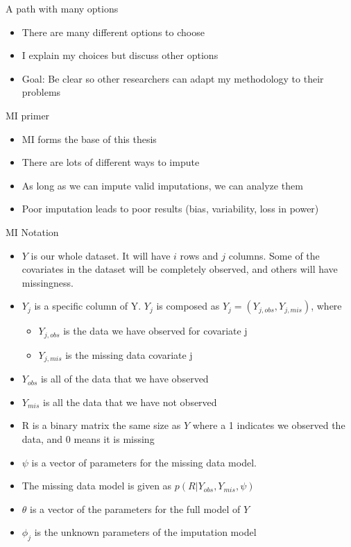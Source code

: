 \begin{frame}{A path with many options}
 \begin{itemize}
  \item There are many different options to choose
  \item I explain my choices but discuss other options
  \item Goal: Be clear so other researchers can adapt my methodology to their problems
 \end{itemize}

\end{frame}

\begin{frame}{MI primer}
\begin{itemize}
 \item MI forms the base of this thesis
 \item There are lots of different ways to impute
 \item As long as we can impute valid imputations, we can analyze them
 \item Poor imputation leads to poor results (bias, variability, loss in power)
\end{itemize}
\end{frame}

\begin{frame}{MI Notation}
 
 \begin{itemize}
\item $Y$ is our whole dataset. It will have $i$ rows and $j$ columns. Some of the covariates in the dataset will be completely observed, and others will have missingness.
\item $Y_j$ is a specific column of Y. $Y_j$ is composed as $Y_j=(Y_{j,obs},Y_{j,mis})$, where
	\begin{itemize}
	\item $Y_{j,obs}$ is the data we have observed for covariate j
	\item $Y_{j,mis}$ is the missing data covariate j
\end{itemize} 
\item $Y_{obs}$ is all of the data that we have observed
\item $Y_{mis}$ is all the data that we have not observed
\item R is a binary matrix the same size as $Y$ where a 1 indicates we observed the data, and 0 means it is missing
\item $\psi$ is a vector of parameters for the missing data model. 
\item The missing data model is given as $p(R|Y_{obs},Y_{mis},\psi)$
\item $\theta$ is a vector of the parameters for the full model of $Y$
\item $\phi_j$ is the unknown parameters of the imputation model 
\end{itemize}
\end{frame}

